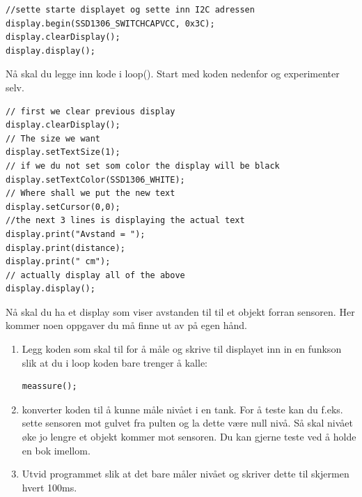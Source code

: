 \begin{lstlisting}[language=Arduino]
//sette starte displayet og sette inn I2C adressen
display.begin(SSD1306_SWITCHCAPVCC, 0x3C); 
display.clearDisplay();
display.display();
\end{lstlisting}
\newpage
Nå skal du legge inn kode i loop(). Start med koden nedenfor og experimenter selv. 
\begin{lstlisting}[language=Arduino]
// first we clear previous display
display.clearDisplay();
// The size we want
display.setTextSize(1);
// if we du not set som color the display will be black
display.setTextColor(SSD1306_WHITE);
// Where shall we put the new text
display.setCursor(0,0);
//the next 3 lines is displaying the actual text
display.print("Avstand = ");
display.print(distance);
display.print(" cm");
// actually display all of the above
display.display(); 
\end{lstlisting}

\vskip 5pt 
Nå skal du ha et display som viser avstanden til til et objekt forran sensoren. Her kommer noen oppgaver du må finne ut av på egen hånd.
\begin{enumerate}
	\item Legg koden som skal til for å måle og skrive til displayet inn in en funkson slik at du i loop koden bare trenger å kalle:
	\begin{lstlisting}[language=Arduino]
	meassure();
	\end{lstlisting}
	\item konverter koden til å kunne måle nivået i en tank. For å teste kan du f.eks. sette sensoren mot gulvet fra  pulten og la dette være null nivå. Så skal nivået øke jo lengre et objekt kommer mot sensoren. Du kan gjerne teste ved å holde en bok imellom. 
	\item Utvid programmet slik at det bare måler nivået og skriver dette til skjermen hvert 100ms. 
\end{enumerate}





